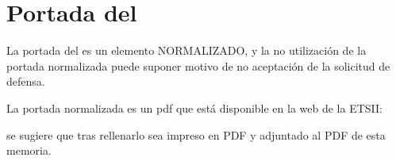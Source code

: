 
\chapter*{Portada del \TF}



La portada del \TF es un elemento NORMALIZADO, y la no utilización de la portada normalizada puede suponer motivo de no aceptación de la solicitud de defensa.

La portada normalizada es un pdf que está disponible en la web de la ETSII: 

\texttt{\enlacedescargas}

se sugiere que tras rellenarlo sea impreso en PDF y adjuntado al PDF de esta memoria.
